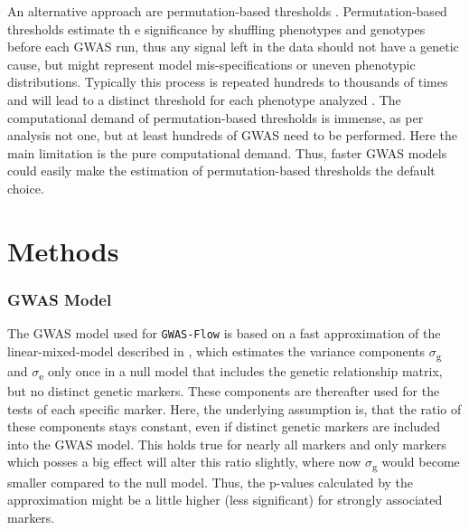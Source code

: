 An alternative approach are permutation-based thresholds \cite{che2014adaptive}. Permutation-based thresholds estimate th
e significance by shuffling phenotypes and genotypes before each GWAS run, thus any signal left in the data should not have
a genetic cause, but might represent model mis-specifications or uneven phenotypic distributions. Typically this process is
repeated hundreds to thousands of times and will lead to a distinct threshold for each phenotype analyzed \cite{togninalli2017aragwas}.
The computational demand of permutation-based thresholds is immense, as per analysis not one, but at least hundreds of GWAS need
to be performed. Here the main limitation is the pure computational demand. Thus, faster GWAS models could easily make the
estimation of permutation-based thresholds the default choice.

\section{Methods}

\subsubsection{GWAS Model}
The GWAS model used for \texttt{GWAS-Flow} is based on a fast approximation of the linear-mixed-model described in
\cite{kang2010variance,Zhang2010}, which estimates the variance components $\sigma$\textsubscript{g} and $\sigma$\textsubscript{e}
only once in a null model that includes the genetic relationship matrix, but no distinct genetic markers. These components are
thereafter used for the tests of each specific marker. Here, the underlying assumption is, that the ratio of these components
stays constant, even if distinct genetic markers are included into the GWAS model. This holds true for nearly all markers and
only markers which posses a big effect will alter this ratio slightly, where now $\sigma$\textsubscript{g} would become smaller
compared to the null model. Thus, the p-values calculated by the approximation might be a little higher (less significant) for
strongly associated markers. 

